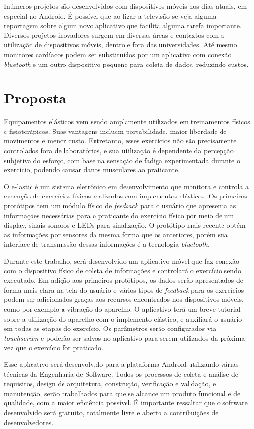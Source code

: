 Inúmeros projetos são desenvolvidos com dispositivos móveis nos dias atuais, em especial no Android. É possível que ao ligar a televisão se veja alguma reportagem sobre algum novo aplicativo que facilita alguma tarefa importante. Diversos projetos inovadores surgem em diversas áreas e contextos com a utilização de dispositivos móveis, dentro e fora das universidades. Até mesmo monitores cardíacos podem ser substituídos por um aplicativo com conexão \textit{bluetooth} e um outro dispositivo pequeno para coleta de dados, reduzindo custos.
\section{Proposta}
Equipamentos elásticos vem sendo amplamente utilizados em treinamentos físicos e fisioterápicos. Suas vantagens incluem portabilidade, maior liberdade de movimentos e menor custo. Entretanto, esses exercícios não são precisamente controlados fora de laboratórios, e sua utilização é dependente da percepção subjetiva do esforço, com base na sensação de fadiga experimentada durante o exercício, podendo causar danos musculares ao praticante.

O e-lastic é um sistema eletrônico em desenvolvimento que monitora e controla a execução de exercícios físicos realizados com implementos elásticos. Os primeiros protótipos tem um módulo físico de \textit{feedback} para o usuário que apresenta as informações necessárias para o praticante do exercício físico por meio de um display, sinais sonoros e LEDs para sinalização. O protótipo mais recente obtém as informações por sensores da mesma forma que os anteriores, porém sua interface de transmissão dessas informações é a tecnologia \textit{bluetooth}.

Durante este trabalho, será desenvolvido um aplicativo móvel que faz conexão com o dispositivo físico de coleta de informações e controlará o exercício sendo executado. Em adição aos primeiros protótipos, os dados serão apresentados de forma mais clara na tela do usuário e vários tipos de \textit{feedback} para os exercícios podem ser adicionados graças aos recursos encontrados nos dispositivos móveis, como por exemplo a vibração do aparelho. O aplicativo terá um breve tutorial sobre a utilização do aparelho com o implemento elástico, e auxiliará o usuário em todas as etapas do exercício. Os parâmetros serão configurados via \textit{touchscreen} e poderão ser salvos no aplicativo para serem utilizados da próxima vez que o exercício for praticado.

Esse aplicativo será desenvolvido para a plataforma Android utilizando várias técnicas da Engenharia de Software. Todos os processos de coleta e análise de requisitos, design de arquitetura, construção, verificação e validação, e manutenção, serão trabalhados para que se alcance um produto funcional e de qualidade, com a maior eficiência possível. É importante ressaltar que o software desenvolvido será gratuito, totalmente livre e aberto a contribuições de desenvolvedores.
